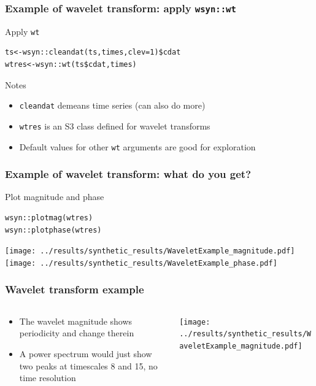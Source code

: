 \documentclass{beamer}
\begin{document}
\begin{frame}[fragile]
\frametitle{Example of wavelet transform: apply \texttt{wsyn::wt}}
\begin{exampleblock}{Apply \texttt{wt}}
\begin{verbatim}
ts<-wsyn::cleandat(ts,times,clev=1)$cdat
wtres<-wsyn::wt(ts$cdat,times)
\end{verbatim}
\end{exampleblock}
\begin{block}{Notes}
\begin{itemize}
\item \texttt{cleandat} demeans time series (can also do more)
\item \texttt{wtres} is an S3 class defined for wavelet transforms
\item Default values for other \texttt{wt} arguments are good for exploration
\end{itemize}
\end{block}
\end{frame}

\begin{frame}[fragile]
\frametitle{Example of wavelet transform: what do you get?}
\begin{exampleblock}{Plot magnitude and phase}
\begin{verbatim}
wsyn::plotmag(wtres)
wsyn::plotphase(wtres)
\end{verbatim}
\end{exampleblock}
\texttt{[image: ../results/synthetic\_results/WaveletExample\_magnitude.pdf]}
\texttt{[image: ../results/synthetic\_results/WaveletExample\_phase.pdf]}
\end{frame}

\begin{frame}
\frametitle{Wavelet transform example}
\begin{columns}[c]
\begin{column}{6cm}
\begin{itemize}
\item The wavelet magnitude shows periodicity and change therein
\item A power spectrum would just show two peaks at timescales 8 and 15, no time resolution
\end{itemize}
\end{column}
\begin{column}{6cm}
\texttt{[image: ../results/synthetic\_results/WaveletExample\_magnitude.pdf]}
\end{column}
\end{columns}
\end{frame}
\end{document}
